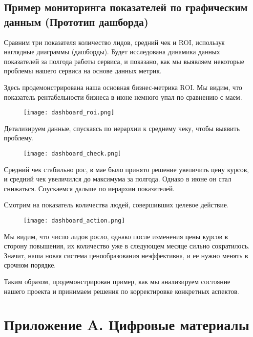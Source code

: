 \documentclass[12pt]{article}
\begin{document}
\subsection{Пример мониторинга показателей по графическим данным (Прототип дашборда)}

Сравним три показателя количество лидов, средний чек и ROI, используя наглядные диаграммы (дашборды). Будет исследована динамика данных показателей за полгода работы сервиса, и показано, как мы выявляем некоторые проблемы нашего сервиса на основе данных метрик.

Здесь продемонстрирована наша основная бизнес-метрика ROI. Мы видим, что показатель рентабельности бизнеса в июне немного упал по сравнению с маем.

\begin{figure}[H]
\centering
\texttt{[image: dashboard\_roi.png]}
\end{figure}

Детализируем данные, спускаясь по иерархии к среднему чеку, чтобы выявить проблему. 

\begin{figure}[H]
\centering
\texttt{[image: dashboard\_check.png]}
\end{figure}


Средний чек стабильно рос, в мае было принято решение увеличить цену курсов, и средний чек увеличился до максимума за полгода. Однако в июне он стал снижаться. Спускаемся дальше по иерархии показателей. 

Смотрим на показатель количества людей, совершивших целевое действие.

\begin{figure}[H]
\centering
\texttt{[image: dashboard\_action.png]}
\end{figure}


Мы видим, что число лидов росло, однако после изменения цены курсов в сторону повышения, их количество уже в следующем месяце сильно сократилось. Значит, наша новая система ценообразования неэффективна, и ее нужно менять в срочном порядке. 

Таким образом, продемонстрирован пример, как мы анализируем состояние нашего проекта и принимаем решения по корректировке конкретных аспектов.




\section*{Приложение A. Цифровые материалы}
\end{document}
